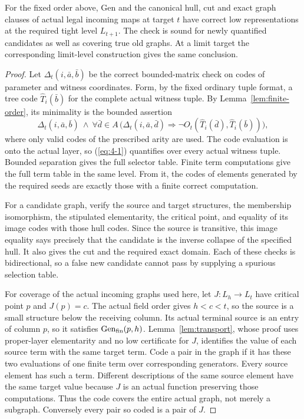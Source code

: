 \begin{theorem}\label{thm:certificate}
For the fixed order above, Gen and the canonical hull, cut and exact
graph clauses of actual legal incoming maps at target $t$ have correct
low representations
at the required tight level $L_{t+1}$. The check is sound for newly
quantified candidates as well as covering true old graphs. At a limit
target the corresponding limit-level construction gives the same
conclusion.
\end{theorem}
\begin{proof}
Let $\Delta_t(i,\bar a,\bar b)$ be the correct bounded-matrix check on
codes of parameter and witness coordinates. Form, by the fixed
ordinary tuple format, a tree code $\widehat T_i(\bar b)$ for the
complete actual witness tuple. By Lemma~\ref{lem:finite-order}, its
minimality is the bounded assertion
\begin{equation}\label{eq:4-1}
 \Delta_t(i,\bar a,\bar b)\ \wedge\
 \forall\bar d\in A\,
 \bigl(\Delta_t(i,\bar a,\bar d)\Rightarrow
 \neg O_t(\widehat T_i(\bar d),\widehat T_i(\bar b))\bigr),       
\end{equation}
where only valid codes of the prescribed arity are used. The code
evaluation is onto the actual layer, so (\ref{eq:4-1}) quantifies over every
actual witness tuple. Bounded separation gives the full selector
table. Finite term computations give the full term table in the same
level. From it, the codes of elements generated by the required
seeds are exactly those with a finite correct computation.

For a candidate graph, verify the source and target structures, the
membership isomorphism, the stipulated elementarity, the critical
point, and equality of its image codes with those hull codes. Since
the source is transitive, this image equality says precisely that
the candidate is the inverse collapse of the specified hull. It
also gives the cut and the required exact domain. Each of these
checks is bidirectional, so a false new candidate cannot pass by
supplying a spurious selection table. 

For coverage of the actual incoming graphs used here, let
$J:L_h\to L_t$ have critical point $p$ and $J(p)=c$. The actual field
order gives $h<c<t$, so the source is a small structure below the
receiving column. Its actual
terminal source is an entry of column $p$, so it satisfies $\operatorname{Gen_{fin}}(p,h)$.
Lemma~\ref{lem:transport}, whose proof uses proper-layer elementarity
and no low certificate for $J$, identifies the value of each source
term with the same target term. Code a pair in the graph if it has
these two evaluations of one finite term over corresponding generators.
Every source element has such a term. Different descriptions of the
same source element have the same target value because $J$ is an
actual function preserving those computations. Thus the code covers
the entire actual graph, not merely a subgraph. Conversely every pair
so coded is a pair of $J$.


\end{proof}
